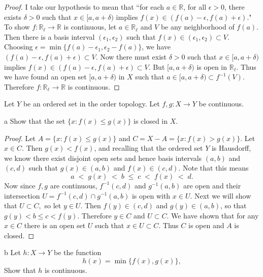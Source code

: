 \documentclass[11pt]{article}
\begin{document}
\begin{proof}
  I take our hypothesis to mean that ``for each $a \in \mathbb{R}$, for all
  $\epsilon > 0$, there exists $\delta > 0$ such that $x \in [a, a + \delta)$
  implies $f(x) \in (f(a) - \epsilon, f(a) + \epsilon).$" To show $f:
  \mathbb{R}_\ell \to \mathbb{R}$ is continuous, let $a \in \mathbb{R}_\ell$ and $V$
  be any neighborhood of $f(a)$. Then there is a basis interval $(\epsilon_1,
  \epsilon_2)$ such that $f(x) \in (\epsilon_1, \epsilon_2) \subset V$. Choosing
  $\epsilon = \min\{f(a) - \epsilon_1, \epsilon_2 - f(a)\}$, we have $(f(a) -
  \epsilon, f(a) + \epsilon) \subset V$. Now there must exist $\delta >
  0$ such that $x \in [a, a + \delta)$ implies $f(x) \in (f(a) - \epsilon, f(a)
  + \epsilon) \subset V.$ But $[a, a + \delta)$ is open in $\mathbb{R}_\ell$. Thus we have
  found an open set $[a, a + \delta)$ in $X$ such that $a \in [a, a + \delta)
  \subset f^{-1}(V)$. Therefore $f:\mathbb{R}_\ell \to \mathbb{R}$ is
  continuous.
\end{proof}

\begin{ex}{18.8}
  Let $Y$ be an ordered set in the order topology. Let $f, g : X \to Y$ be
  continuous.
\end{ex}

\begin{p}{a}
  Show that the set $\{x : f(x) \leq g(x)\}$ is closed in $X$.
\end{p}

\begin{proof}
  Let $A = \{x : f(x) \leq g(x)\}$ and $C = X - A = \{x : f(x) > g(x)\}$. Let $x
  \in C$. Then $g(x) < f(x)$, and recalling that the ordered set $Y$ is
  Hausdorff, we know there exist disjoint open sets and hence basis
  intervals $(a, b)$ and $(c, d)$ such that $g(x) \in (a, b)$ and $f(x) \in (c,
  d)$. Note that this means
  \[ a \;<\; g(x) \;<\; b \;\leq\; c \;<\; f(x) \;<\; d. \]
  Now since $f, g$ are continuous, $f^{-1}(c, d)$ and $g^{-1}(a, b)$ are open
  and their intersection $U = f^{-1}(c, d) \cap g^{-1}(a, b)$ is open with $x
  \in U$. Next we will show that $U \subset C,$ so let $y \in U$. Then $f(y) \in
  (c, d)$ and $g(y) \in (a, b)$, so that $g(y) < b \leq c < f(y)$. Therefore $y
  \in C$ and $U \subset C$. We have shown that for any $x \in C$ there is an
  open set $U$ such that $x \in U \subset C$. Thus $C$ is open and $A$ is closed.
\end{proof}

\begin{p}{b}
  Let $h : X \to Y$ be the function
  \[ h(x) = \min\{f(x), g(x)\}, \]
  Show that $h$ is continuous.
\end{p}
\end{document}
